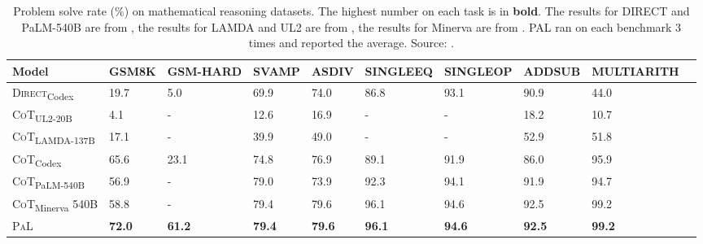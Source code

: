 \begin{table}[h!]
	\centering
	\tiny
	\begin{tabularx}{\textwidth}{XXXXXXXXXX}
		\hline
		\textbf{Model}                           & \textbf{GSM8K} & \textbf{GSM-HARD} & \textbf{SVAMP} & \textbf{ASDIV} & \textbf{SINGLEEQ} & \textbf{SINGLEOP} & \textbf{ADDSUB} & \textbf{MULTIARITH} \\ \hline
		\textsc{Direct}\textsubscript{Codex}     & 19.7           & 5.0               & 69.9           & 74.0           & 86.8              & 93.1              & 90.9            & 44.0                \\
		\textsc{CoT}\textsubscript{UL2-20B}      & 4.1            & -                 & 12.6           & 16.9           & -                 & -                 & 18.2            & 10.7                \\
		\textsc{CoT}\textsubscript{LAMDA-137B}   & 17.1           & -                 & 39.9           & 49.0           & -                 & -                 & 52.9            & 51.8                \\
		\textsc{CoT}\textsubscript{Codex}        & 65.6           & 23.1              & 74.8           & 76.9           & 89.1              & 91.9              & 86.0            & 95.9                \\
		\textsc{CoT}\textsubscript{PaLM-540B}    & 56.9           & -                 & 79.0           & 73.9           & 92.3              & 94.1              & 91.9            & 94.7                \\
		\textsc{CoT}\textsubscript{Minerva} 540B & 58.8           & -                 & 79.4           & 79.6           & 96.1              & 94.6              & 92.5            & 99.2                \\
		\textsc{PaL}                             & \textbf{72.0}  & \textbf{61.2}     & \textbf{79.4}  & \textbf{79.6}  & \textbf{96.1}     & \textbf{94.6}     & \textbf{92.5}   & \textbf{99.2}       \\ \hline
	\end{tabularx}
	\caption{Problem solve rate (\%) on mathematical reasoning datasets. The highest number on each task is in \textbf{bold}. The results for DIRECT and PaLM-540B are from \textcite{wei2022chain}, the results for LAMDA and UL2 are from \textcite{wang2022self}, the results for Minerva are from \textcite{lewkowycz2022minerva}. PAL ran on each benchmark 3 times and reported the average. Source: \textcite{gao2022pal}.}
	\label{tab:pal-math}
\end{table}
